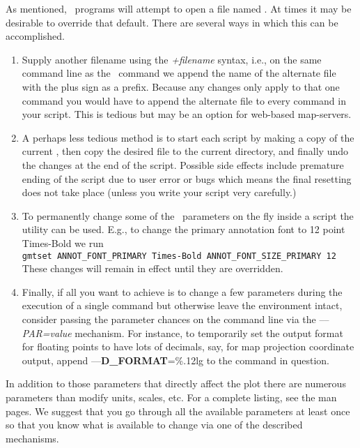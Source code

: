As mentioned, \GMT\ programs will attempt to open a file named
.  At times it may be desirable to override
that default.  There are several ways in which this can be accomplished.
\begin{enumerate}
\item Supply another filename using the \emph{+filename} syntax, i.e.,
on the same command line as the \GMT\ command we append the name of
the alternate  file with the plus sign as a prefix.
Because any changes only apply to that one command you would have to
append the alternate file to every command in your script.  This is
tedious but may be an option for web-based map-servers.
\item A perhaps less tedious method is to start each script by making a
copy of the current , then copy the desired
 file to the current directory, and finally
undo the changes at the end of the script.  Possible side effects
include premature ending of the script due to user error or bugs which
means the final resetting does not take place (unless you write your
script very carefully.)
\item To permanently change some of the \GMT\ parameters on the fly
inside a script the  utility can be used.  E.g., to
change the primary annotation font to 12 point Times-Bold we run \\

\texttt{gmtset ANNOT\_FONT\_PRIMARY Times-Bold ANNOT\_FONT\_SIZE\_PRIMARY 12} \\

These changes will remain in effect until they are overridden.
\item Finally, if all you want to achieve is to change a few parameters during
the execution of a single command but otherwise leave the environment intact, consider
passing the parameter chances on the command line via the {--}{--}\emph{PAR=value}
mechanism.  For instance, to temporarily set the output format for floating
points to have lots of decimals, say, for map projection coordinate output,
append {--}{--}{\bf D\_FORMAT}=\%.12lg to the command in question.
\end{enumerate}
In addition to those parameters
that directly affect the plot there are numerous parameters than
modify units, scales, etc.  For a complete listing, see the
 man pages.  We suggest that you go through
all the available parameters at least once so that you know what is
available to change via one of the described mechanisms.

